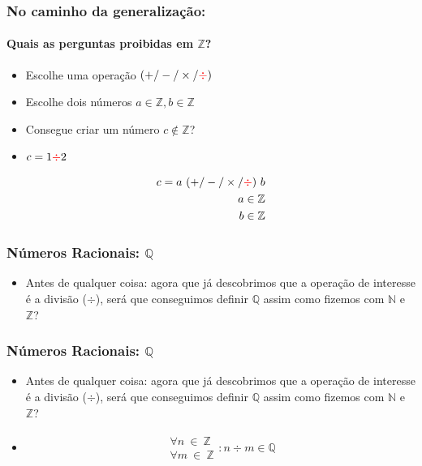\documentclass[usenames,dvipsnames,svgnames]{beamer}
\begin{document}
\begin{frame}	
	\frametitle{No caminho da generalização:}
	\framesubtitle{Quais as perguntas proibidas em $\mathbb{Z}$?}

	\begin{itemize}
		\item Escolhe uma operação $(+ / - / \times / {\color{red}\div})$
		\item Escolhe dois números $a \in \mathbb{Z}, b \in \mathbb{Z}$
		\item Consegue criar um número $c \not \in \mathbb{Z}$?
		\item $c = 1 {\color{red}\div} 2$
	\end{itemize}

	\begin{equation}
	\begin{aligned}
		c = a ~ (+ / - / \times / {\color{red}\div}) ~ b \\
		a \in \mathbb{Z} \\
		b \in \mathbb{Z}
	\end{aligned}
	\end{equation}
\end{frame}

\begin{frame}	
	\frametitle{Números Racionais: $\mathbb{Q}$}

	\begin{itemize}
		\item Antes de qualquer coisa: agora que já descobrimos que a operação de interesse é a divisão ($\div$), será que conseguimos definir $\mathbb{Q}$ assim como fizemos com $\mathbb{N}$ e $\mathbb{Z}$?
	\end{itemize}
\end{frame}

\begin{frame}	
	\frametitle{Números Racionais: $\mathbb{Q}$}

	\begin{itemize}
		\item Antes de qualquer coisa: agora que já descobrimos que a operação de interesse é a divisão ($\div$), será que conseguimos definir $\mathbb{Q}$ assim como fizemos com $\mathbb{N}$ e $\mathbb{Z}$?
		\item
		\begin{equation}
		\begin{aligned}
			\substack{\forall n ~\in~ \mathbb{Z} \\ \forall m ~\in~ \mathbb{Z}}: n \div m \in \mathbb{Q}
		\end{aligned}
		\end{equation}
	\end{itemize}
\end{frame}
\end{document}
